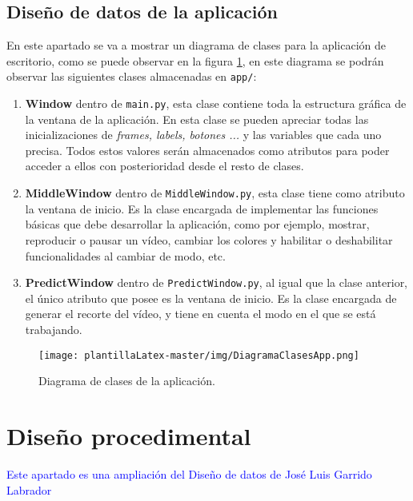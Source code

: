\subsection{Diseño de datos de la aplicación}
En este apartado se va a mostrar un diagrama de clases para la aplicación de escritorio, como se puede observar en la figura \ref{fig:DiagramaClasesApp}, en este diagrama se podrán observar las siguientes clases almacenadas en \texttt{app/}:
\begin{enumerate}
    \item \textbf{Window} dentro de \texttt{main.py}, esta clase contiene toda la estructura gráfica de la ventana de la aplicación. En esta clase se pueden apreciar todas las inicializaciones de \textit{frames, labels, botones ...} y las variables que cada uno precisa. Todos estos valores serán almacenados como atributos para poder acceder a ellos con posterioridad desde el resto de clases. 
    \item \textbf{MiddleWindow} dentro de \texttt{MiddleWindow.py}, esta clase tiene como atributo la ventana de inicio. Es la clase encargada de implementar las funciones básicas que debe desarrollar la aplicación, como por ejemplo, mostrar, reproducir o pausar un vídeo, cambiar los colores y habilitar o deshabilitar funcionalidades al cambiar de modo, etc. 
    \item \textbf{PredictWindow} dentro de \texttt{PredictWindow.py}, al igual que la clase anterior, el único atributo que posee es la ventana de inicio. Es la clase encargada de generar el recorte del vídeo, y tiene en cuenta el modo en el que se está trabajando.
\end{enumerate}

\begin{figure}
    \centering
    \texttt{[image: plantillaLatex-master/img/DiagramaClasesApp.png]}
    \caption{Diagrama de clases de la aplicación.}
    \label{fig:DiagramaClasesApp}
\end{figure}

\newpage
\section{Diseño procedimental}
\textcolor{blue}{Este apartado es una ampliación del Diseño de datos de José Luis Garrido Labrador}


